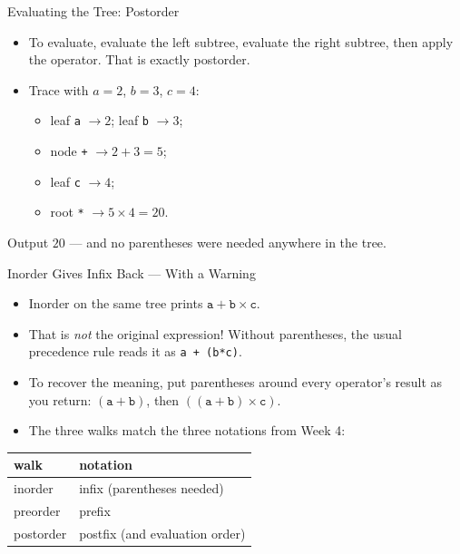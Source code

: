 \documentclass[aspectratio=169]{beamer}
\begin{document}
\begin{frame}{Evaluating the Tree: Postorder}
  \begin{itemize}
    \item To evaluate, evaluate the left subtree, evaluate the right
      subtree, then apply the operator. That is exactly postorder.
    \item Trace with $a=2$, $b=3$, $c=4$:
      \begin{itemize}
        \item leaf \texttt{a} $\to 2$; leaf \texttt{b} $\to 3$;
        \item node \texttt{+} $\to 2+3=5$;
        \item leaf \texttt{c} $\to 4$;
        \item root \texttt{*} $\to 5\times 4=20$.
      \end{itemize}
  \end{itemize}
  \begin{exampleblock}{Output}
    $20$ --- and no parentheses were needed anywhere in the tree.
  \end{exampleblock}
\end{frame}

\begin{frame}{Inorder Gives Infix Back --- With a Warning}
  \begin{itemize}
    \item Inorder on the same tree prints
      $\texttt{a} + \texttt{b} \times \texttt{c}$.
    \item That is \emph{not} the original expression! Without parentheses,
      the usual precedence rule reads it as \texttt{a + (b*c)}.
    \item To recover the meaning, put parentheses around every operator's
      result as you return:
      $(\texttt{a}+\texttt{b})$, then $((\texttt{a}+\texttt{b})\times
      \texttt{c})$.
    \item The three walks match the three notations from Week 4:
  \end{itemize}
  \begin{center}
  {\footnotesize
  \begin{tabular}{l l}
    \toprule
    \textbf{walk} & \textbf{notation} \\
    \midrule
    inorder   & infix (parentheses needed) \\
    preorder  & prefix \\
    postorder & postfix (and evaluation order) \\
    \bottomrule
  \end{tabular}}
  \end{center}
\end{frame}
\end{document}
